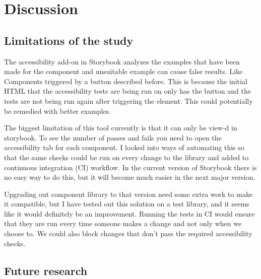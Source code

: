 \documentclass{master_thesis}
\begin{document}
\section{Discussion}

\subsection{Limitations of the study}


The accessibility add-on in Storybook analyzes the examples that have been made for the component and unsuitable example can cause false results. Like Components triggered by a button described before. This is because the initial HTML that the accessibility tests are being run on only has the button and the tests are not being run again after triggering the element. This could potentially be remedied with better examples.

The biggest limitation of this tool currently is that it can only be view-d in storybook. To see the number of passes and fails you need to open the accessibility tab for each component. I looked into ways of automating this so that the same checks could be run on every change to the library and added to continuous integration (CI) workflow. In the current version of Storybook there is no easy way to do this, but it will become much easier in the next major version.

Upgrading out component library to that version need some extra work to make it compatible, but I have tested out this solution on a test library, and it seems like it would definitely be an improvement. Running the tests in CI would ensure that they are run every time someone makes a change and not only when we choose to. We could also block changes that don't pass the required accessibility checks.


\subsection{Future research}
\end{document}

